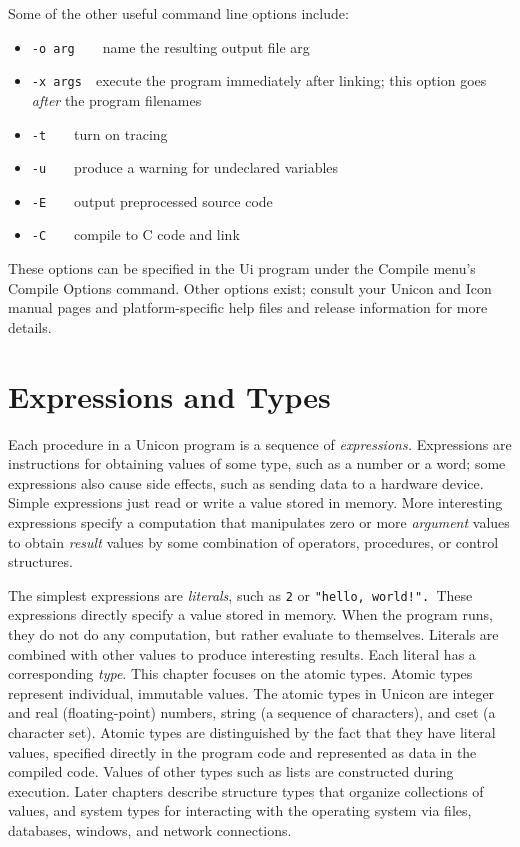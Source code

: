 Some of the other useful command line options include:

\begin{itemize}
\item \texttt{{}-o arg}\ \ \ \ name the resulting output file arg
\item \texttt{{}-x args}\ \ execute the program immediately after linking;
		 this option goes \textit{after} the program filenames
\item \texttt{{}-t}\ \ \ \ turn on tracing
\item \texttt{{}-u}\ \ \ \ produce a warning for undeclared variables
\item \texttt{{}-E}\ \ \ \ output preprocessed source code
\item \texttt{{}-C}\ \ \ \ compile to C code and link
\end{itemize}

These options can be specified in the Ui program under the Compile
menu's Compile Options command. Other options exist;
consult your Unicon and Icon manual pages and platform-specific help
files and release information for more details.

\section{Expressions and Types}

Each procedure in a Unicon program is a sequence of
\textit{expression}\textit{s.} Expressions are
instructions for obtaining values of some
type, such as a number or a word; some expressions also
cause side effects, such as sending data to a hardware device.
Simple expressions just read or write a value stored in
memory. More interesting expressions specify a computation that
manipulates zero or more \textit{argument} values to
obtain \textit{result} values by some combination of
operators, procedures, or control structures.

The simplest expressions are \textit{literal}\textit{s},
such as \texttt{2} or \texttt{"hello,
world!"}\texttt{. }These expressions directly specify a
value stored in memory. When the program runs, they do not do any
computation, but rather evaluate to themselves. Literals are combined
with other values to produce interesting results. Each literal has a
corresponding \textit{type}. This chapter focuses on the atomic types. Atomic types represent individual, immutable values. The atomic types in Unicon are
integer and real (floating-point)
numbers, string (a sequence of characters), and
cset (a character set). Atomic types
are distinguished by the fact that they have literal values, specified
directly in the program code and represented as data in the compiled
code. Values of other types such as lists are constructed during
execution. Later chapters describe structure types that organize
collections of values, and system types for interacting with the
operating system via files, databases, windows, and network
connections. 

